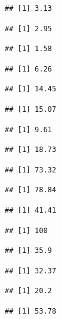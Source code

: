 \documentclass[,man,floatsintext]{apa6}
\begin{document}
\begin{verbatim}
## [1] 3.13
\end{verbatim}

\begin{verbatim}
## [1] 2.95
\end{verbatim}

\begin{verbatim}
## [1] 1.58
\end{verbatim}

\begin{verbatim}
## [1] 6.26
\end{verbatim}

\begin{verbatim}
## [1] 14.45
\end{verbatim}

\begin{verbatim}
## [1] 15.07
\end{verbatim}

\begin{verbatim}
## [1] 9.61
\end{verbatim}

\begin{verbatim}
## [1] 18.73
\end{verbatim}

\begin{verbatim}
## [1] 73.32
\end{verbatim}

\begin{verbatim}
## [1] 78.84
\end{verbatim}

\begin{verbatim}
## [1] 41.41
\end{verbatim}

\begin{verbatim}
## [1] 100
\end{verbatim}

\begin{verbatim}
## [1] 35.9
\end{verbatim}

\begin{verbatim}
## [1] 32.37
\end{verbatim}

\begin{verbatim}
## [1] 20.2
\end{verbatim}

\begin{verbatim}
## [1] 53.78
\end{verbatim}
\end{document}
